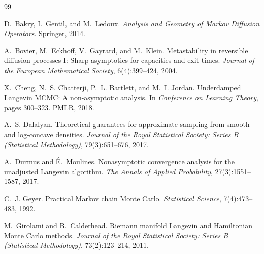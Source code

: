 \documentclass[11pt,a4paper]{report}
\begin{document}
\tableofcontents









\begin{thebibliography}{99}

D.~Bakry, I.~Gentil, and M.~Ledoux.
\newblock \emph{Analysis and Geometry of Markov Diffusion Operators}.
\newblock Springer, 2014.

A.~Bovier, M.~Eckhoff, V.~Gayrard, and M.~Klein.
\newblock Metastability in reversible diffusion processes {I}: Sharp
  asymptotics for capacities and exit times.
\newblock \emph{Journal of the European Mathematical Society}, 6(4):399--424,
  2004.

X.~Cheng, N.~S. Chatterji, P.~L. Bartlett, and M.~I. Jordan.
\newblock Underdamped {L}angevin {MCMC}: A non-asymptotic analysis.
\newblock In \emph{Conference on Learning Theory}, pages 300--323. PMLR, 2018.

A.~S. Dalalyan.
\newblock Theoretical guarantees for approximate sampling from smooth and
  log-concave densities.
\newblock \emph{Journal of the Royal Statistical Society: Series B (Statistical
  Methodology)}, 79(3):651--676, 2017.

A.~Durmus and \'E.~Moulines.
\newblock Nonasymptotic convergence analysis for the unadjusted {L}angevin
  algorithm.
\newblock \emph{The Annals of Applied Probability}, 27(3):1551--1587, 2017.

C.~J. Geyer.
\newblock Practical {M}arkov chain {M}onte {C}arlo.
\newblock \emph{Statistical Science}, 7(4):473--483, 1992.

M.~Girolami and B.~Calderhead.
\newblock Riemann manifold {L}angevin and {H}amiltonian {M}onte {C}arlo
  methods.
\newblock \emph{Journal of the Royal Statistical Society: Series B
  (Statistical Methodology)}, 73(2):123--214, 2011.


\end{thebibliography}
\end{document}
